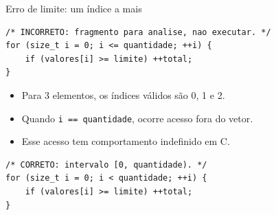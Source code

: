 \begin{frame}[fragile]{Erro de limite: um índice a mais}
\begin{lstlisting}
/* INCORRETO: fragmento para analise, nao executar. */
for (size_t i = 0; i <= quantidade; ++i) {
    if (valores[i] >= limite) ++total;
}
\end{lstlisting}
\begin{itemize}
\item Para 3 elementos, os índices válidos são 0, 1 e 2.
\item Quando \texttt{i == quantidade}, ocorre acesso fora do vetor.
\item Esse acesso tem comportamento indefinido em C.
\end{itemize}
\begin{lstlisting}
/* CORRETO: intervalo [0, quantidade). */
for (size_t i = 0; i < quantidade; ++i) {
    if (valores[i] >= limite) ++total;
}
\end{lstlisting}
\end{frame}
